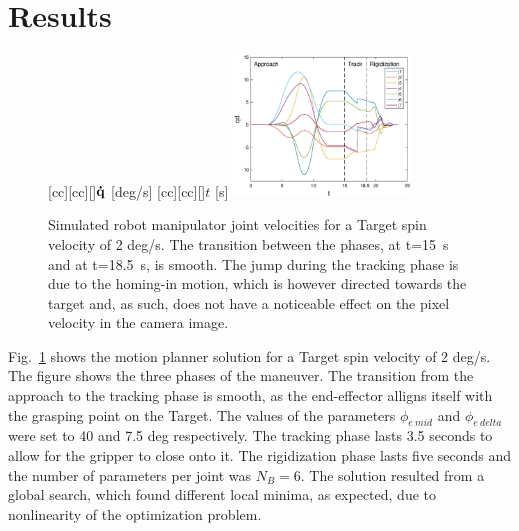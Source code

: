 \section{Results}
\label{sec:results}
%
%
%
%
%
\begin{figure}[t!]
[cc][cc][\FontFigB]{$\boldsymbol {\mathrm{\dot{q}}}$ [deg/s]}
[cc][cc][\FontFigB]{$t$ [s]}
\centering\includegraphics[angle=0,width=0.42\textwidth]{./figures/Joint_vel_2degs_2}
\caption{Simulated robot manipulator joint velocities for a Target spin velocity of 2 deg/s. The transition between the phases, at t=15~s and at t=18.5~s, is smooth. The jump during the tracking phase is due to the homing-in motion, which is however directed towards the target and, as such, does not have a noticeable effect on the pixel velocity in the camera image.}
\label{fig:Joint_vel_2degs}
\end{figure}
%
Fig.~\ref{fig:Joint_vel_2degs} shows the motion planner solution for a Target spin velocity of 2 deg/s. The figure shows the three phases of the maneuver. The transition from the approach to the tracking phase is smooth, as the end-effector alligns itself with the grasping point on the Target. The values of the parameters $\phi_{e \: mid}$ and $\phi_{e \: delta}$  were set to 40 and 7.5 deg respectively. The tracking phase lasts 3.5 seconds to allow for the gripper to close onto it. The rigidization phase  lasts five seconds and the number of parameters per joint was $N_B=6$. The solution resulted from a global search,  which found different local minima, as expected, due to nonlinearity of the optimization problem. 


